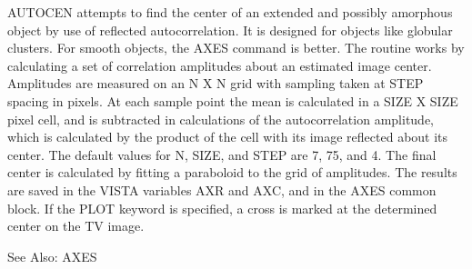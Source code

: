 AUTOCEN attempts to find the center of an extended and possibly amorphous
object by use of reflected autocorrelation.  It is designed for objects
like globular clusters. For smooth objects, the AXES command is better. The
routine works by calculating a set of correlation amplitudes about an
estimated image center. Amplitudes are measured on an N X N grid with
sampling taken at STEP spacing in pixels. At each sample point the mean is
calculated in a SIZE X SIZE pixel cell, and is subtracted in calculations
of the autocorrelation amplitude, which is calculated by the product of the
cell with its image reflected about its center. The default values for N,
SIZE, and STEP are 7, 75, and 4. The final center is calculated by fitting
a paraboloid to the grid of amplitudes. The results are saved in the VISTA
variables AXR and AXC, and in the AXES common block.  If the PLOT keyword
is specified, a cross is marked at the determined center on the TV image.

See Also: AXES

